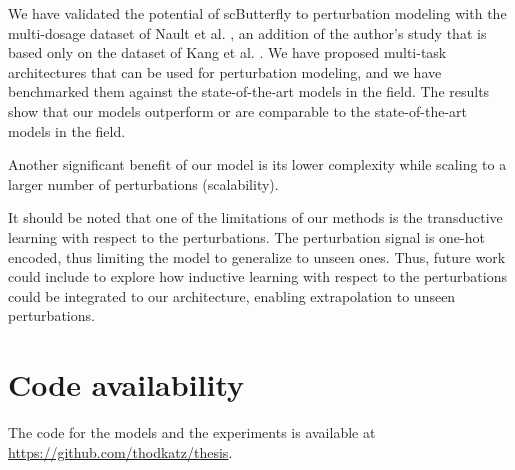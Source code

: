 \documentclass[12pt, a4paper]{article}
\begin{document}
We have validated the potential of scButterfly to perturbation modeling with the multi-dosage dataset of Nault et al. \cite{nault2021single,nault2022benchmarking}, an addition of the author's study that is based only on the dataset of Kang et al. \cite{kanaGenerativeModelingSinglecell2023}. We have proposed multi-task architectures that can be used for perturbation modeling, and we have benchmarked them against the state-of-the-art models in the field. The results show that our models outperform or are comparable to the state-of-the-art models in the field.

Another significant benefit of our model is its lower complexity while scaling to a larger number of perturbations (scalability)\cite{allenspachNeuralMultitaskLearning2024}.

It should be noted that one of the limitations of our methods is the transductive learning with respect to the perturbations. The perturbation signal is one-hot encoded, thus limiting the model to generalize to unseen ones. Thus, future work could include to explore how inductive learning with respect to the perturbations could be integrated to our architecture, enabling extrapolation to unseen perturbations.

\section{Code availability}

The code for the models and the experiments is available at \url{https://github.com/thodkatz/thesis}.

\clearpage


%




\appendix
\end{document}
